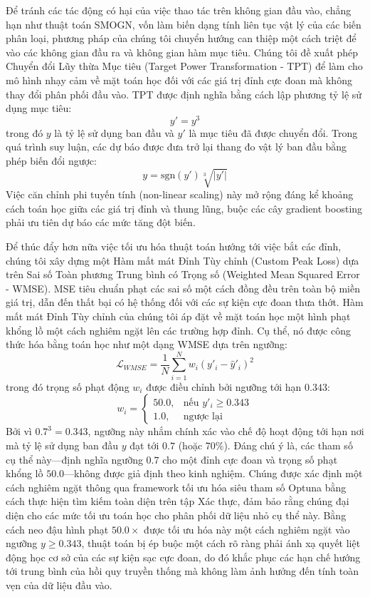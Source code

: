 \documentclass[pdflatex,sn-mathphys-num]{sn-jnl}%
\theoremstyle{thmstyleone}%
\theoremstyle{thmstyletwo}%
\theoremstyle{thmstylethree}%
\begin{document}
Để tránh các tác động có hại của việc thao tác trên không gian đầu vào, chẳng hạn như thuật toán SMOGN, vốn làm biến dạng tính liên tục vật lý của các biến phân loại, phương pháp của chúng tôi chuyển hướng can thiệp một cách triệt để vào các không gian đầu ra và không gian hàm mục tiêu. Chúng tôi đề xuất phép Chuyển đổi Lũy thừa Mục tiêu (Target Power Transformation - TPT) để làm cho mô hình nhạy cảm về mặt toán học đối với các giá trị đỉnh cực đoan mà không thay đổi phân phối đầu vào. TPT được định nghĩa bằng cách lập phương tỷ lệ sử dụng mục tiêu:
\begin{equation}
y' = y^3
\end{equation}
trong đó $y$ là tỷ lệ sử dụng ban đầu và $y'$ là mục tiêu đã được chuyển đổi. Trong quá trình suy luận, các dự báo được đưa trở lại thang đo vật lý ban đầu bằng phép biến đổi ngược:
\begin{equation}
y = \text{sgn}(y') \sqrt[3]{\vert y' \vert}
\end{equation}
Việc căn chỉnh phi tuyến tính (non-linear scaling) này mở rộng đáng kể khoảng cách toán học giữa các giá trị đỉnh và thung lũng, buộc các cây gradient boosting phải ưu tiên dự báo các mức tăng đột biến. 

Để thúc đẩy hơn nữa việc tối ưu hóa thuật toán hướng tới việc bắt các đỉnh, chúng tôi xây dựng một Hàm mất mát Đỉnh Tùy chỉnh (Custom Peak Loss) dựa trên Sai số Toàn phương Trung bình có Trọng số (Weighted Mean Squared Error - WMSE). MSE tiêu chuẩn phạt các sai số một cách đồng đều trên toàn bộ miền giá trị, dẫn đến thất bại có hệ thống đối với các sự kiện cực đoan thưa thớt. Hàm mất mát Đỉnh Tùy chỉnh của chúng tôi áp đặt về mặt toán học một hình phạt khổng lồ một cách nghiêm ngặt lên các trường hợp đỉnh. Cụ thể, nó được công thức hóa bằng toán học như một dạng WMSE dựa trên ngưỡng:
\begin{equation}
\mathcal{L}_{WMSE} = \frac{1}{N} \sum_{i=1}^{N} w_i \left( y'_i - \hat{y}'_i \right)^2
\end{equation}
trong đó trọng số phạt động $w_i$ được điều chỉnh bởi ngưỡng tới hạn $0.343$:
\begin{equation}
w_i = \begin{cases} 50.0, & \text{nếu } y'_i \ge 0.343 \\ 1.0, & \text{ngược lại} \end{cases}
\end{equation}
Bởi vì $0.7^3 = 0.343$, ngưỡng này nhắm chính xác vào chế độ hoạt động tới hạn nơi mà tỷ lệ sử dụng ban đầu $y$ đạt tới $0.7$ (hoặc 70\%). Đáng chú ý là, các tham số cụ thể này---định nghĩa ngưỡng $0.7$ cho một đỉnh cực đoan và trọng số phạt khổng lồ $50.0$---không được giả định theo kinh nghiệm. Chúng được xác định một cách nghiêm ngặt thông qua framework tối ưu hóa siêu tham số Optuna bằng cách thực hiện tìm kiếm toàn diện trên tập Xác thực, đảm bảo rằng chúng đại diện cho các mức tối ưu toán học cho phân phối dữ liệu nhỏ cụ thể này. Bằng cách neo đậu hình phạt $50.0\times$ được tối ưu hóa này một cách nghiêm ngặt vào ngưỡng $y \ge 0.343$, thuật toán bị ép buộc một cách rõ ràng phải ánh xạ quyết liệt động học cơ sở của các sự kiện sạc cực đoan, do đó khắc phục các hạn chế hướng tới trung bình của hồi quy truyền thống mà không làm ảnh hưởng đến tính toàn vẹn của dữ liệu đầu vào.
\end{document}
